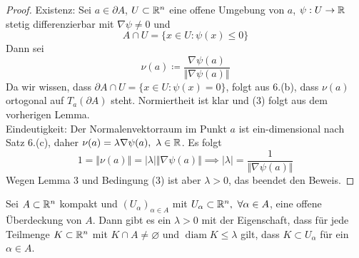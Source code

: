 \begin{proof}
    Existenz: Sei $a\in \partial A$, $U\subset \mathbb{R}^n$ eine offene Umgebung von $a$, $\psi:U\to \mathbb{R}$ stetig differenzierbar mit $\nabla \psi\neq 0$ und 
    \[
    A\cap U = \{ x\in U : \psi(x)\le 0\}    
    \]
    Dann sei 
    \[
    \nu(a)\coloneqq \frac{\nabla\psi(a)}{\Vert \nabla \psi(a)\Vert}    
    \]
    Da wir wissen, dass $\partial A \cap U = \{ x\in U : \psi(x)=0\}$, folgt aus 6.(b), dass $\nu(a)$ ortogonal auf $T_a(\partial A)$ steht. Normiertheit ist klar und (3) folgt aus dem vorherigen Lemma. \\
    Eindeutigkeit: Der Normalenvektorraum im Punkt $a$ ist ein-dimensional nach Satz 6.(c), daher $\nu(a)=\lambda \nabla \psi(a), \ \lambda \in \mathbb{R}$. Es folgt
    \[
    1=\Vert \nu(a) \Vert = \vert \lambda \vert \Vert \nabla \psi(a)\Vert \implies \vert \lambda \vert = \frac{1}{\Vert \nabla \psi(a)\Vert}     
    \]
    Wegen Lemma 3 und Bedingung (3) ist aber $\lambda >0$, das beendet den Beweis. 
\end{proof}
\begin{lemma}
    Sei $A\subset \mathbb{R}^n$ kompakt und $(U_\alpha)_{\alpha\in A}$ mit $U_\alpha \subset \mathbb{R}^n,\ \forall \alpha \in A$, eine offene Überdeckung von $A$.
    Dann gibt es ein $\lambda > 0$ mit der Eigenschaft, dass für jede Teilmenge $K\subset \mathbb{R}^n$ mit $K\cap A \neq \varnothing$ und $\operatorname{diam} K \le \lambda$ gilt, dass $K\subset U_\alpha$ für ein $\alpha \in A$. 
\end{lemma}